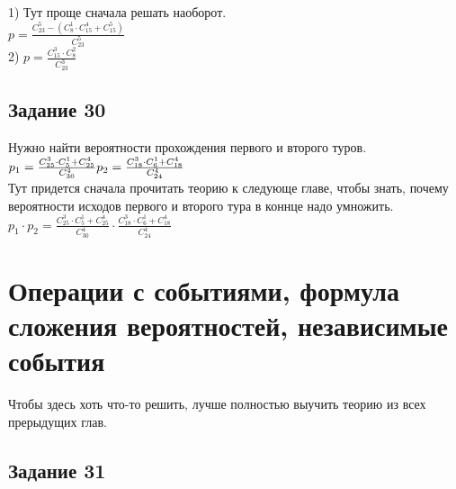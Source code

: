 \documentclass[12pt]{article}
\begin{document}
1)
Тут проще сначала решать наоборот.\\
$
p=\frac{C_{23}^5-(C_{8}^1\cdot C_{15}^4+C_{15}^5)}{C_{23}^5}
$\\
2)
$
p=\frac{C_{15}^3 \cdot C_{8}^2}{C_{23}^3}
$

\newpage
\subsection{Задание 30}
Нужно найти вероятности прохождения первого и второго туров.\\
$
p_1=\frac{C_{25}^3\cdot C_{5}^1+C_{25}^4}{C_{30}^4}\\
p_2=\frac{C_{18}^3\cdot C_{6}^1+C_{18}^4}{C_{24}^4}
$\\
Тут придется сначала прочитать теорию к следующе главе, чтобы знать, почему вероятности исходов первого и второго тура в коннце надо умножить.\\
$
p_1\cdot p_2=\frac{C_{25}^3\cdot C_{5}^1+C_{25}^4}{C_{30}^4}\cdot \frac{C_{18}^3\cdot C_{6}^1+C_{18}^4}{C_{24}^4}
$

\newpage
\section{Операции с событиями, формула сложения вероятностей, независимые события}

Чтобы здесь хоть что-то решить, лучше полностью выучить теорию из всех прерыдущих глав.
\newpage
\subsection{Задание 31}
\end{document}
